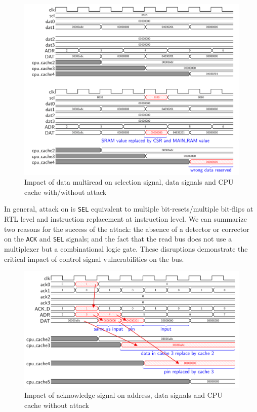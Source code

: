 \begin{figure}[t!]
  \centering
  \includegraphics[width=\linewidth]{Chapitre4/figures/fault5.png}
  \caption{Impact of data multiread on selection signal, data signals and CPU cache with/without attack}
  \label{fault5}
\end{figure}

In general, attack on is \texttt{SEL} equivalent to multiple bit-resets/multiple bit-flips at RTL level and instruction replacement at instruction level. We can summarize two reasons for the success of the attack: the absence of a detector or corrector on the \texttt{ACK} and \texttt{SEL} signals; and the fact that the read bus does not use a multiplexer but a combinational logic gate. These disruptions demonstrate the critical impact of control signal vulnerabilities on the bus.

\begin{figure}[t!]
  \centering
  \includegraphics[width=\linewidth]{Chapitre4/figures/fault1.png}
  \caption{Impact of acknowledge signal on address, data signals and CPU cache without attack}
  \label{fault1}
\end{figure}

